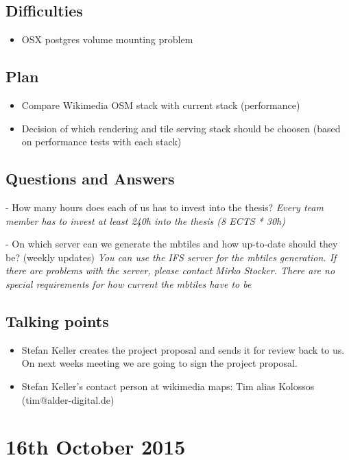 \subsection*{Difficulties}

\begin{itemize}
  \item OSX postgres volume mounting problem
\end{itemize}

\subsection*{Plan}

\begin{itemize}
  \item Compare Wikimedia OSM stack with current stack (performance)
  \item Decision of which rendering and tile serving stack should be choosen (based on performance tests with each stack)
\end{itemize}

\subsection*{Questions and Answers}

- How many hours does each of us has to invest into the thesis?
\textit{Every team member has to invest at least 240h into the thesis (8 ECTS * 30h)}

- On which server can we generate the mbtiles and how up-to-date should they be? (weekly updates)
\textit{You can use the IFS server for the mbtiles generation. If there are problems with the server, please contact Mirko Stocker. There are no special requirements for how current the mbtiles have to be}

\subsection*{Talking points}
\begin{itemize}
  \item Stefan Keller creates the project proposal and sends it for review back to us. On next weeks meeting we are going to sign the project proposal.
  \item Stefan Keller's contact person at wikimedia maps: Tim alias Kolossos (tim@alder-digital.de)
\end{itemize}

\section*{16th October 2015}

